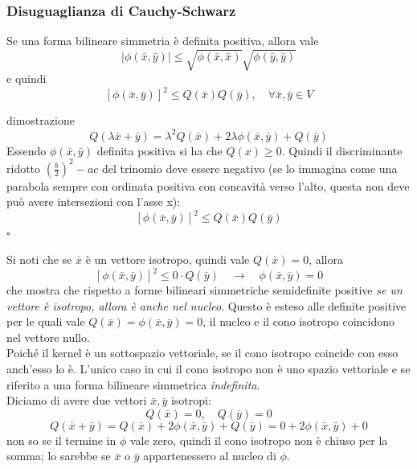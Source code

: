 \documentclass[x11names]{article}
\newcommand*{\QEDB}{\null\nobreak\hfill\ensuremath{\square}}%
\begin{document}
\begin{center}
	\colorbox{myred}{\begin{minipage}{5.75in}
			\begin{redes}{}
				\subsubsection{Disuguaglianza di Cauchy-Schwarz}
				Se una forma bilineare simmetria è definita positiva, allora vale
				\[
				| \phi(\bar{x},\bar{y}) | \leq \sqrt{\phi(\bar{x},\bar{x})} \sqrt{\phi(\bar{y},\bar{y})}
				\] 
				e quindi
				\[
				\left[\phi(\bar{x},\bar{y})\right]^2\leq Q(\bar{x})Q(\bar{y}), \quad \forall \bar{x},\bar{y} \in V
				\]
			\end{redes}
	\end{minipage}}        
\end{center}
\begin{es}{dimostrazione}
	\[
	Q(\lambda \bar{x}+\bar{y}) = \lambda^2Q(\bar{x}) + 2\lambda\phi(\bar{x},\bar{y}) + Q(\bar{y})
	\]
	Essendo $\phi(\bar{x},\bar{y})$ definita positiva si ha che $Q(x) \geq 0$. Quindi il discriminante ridotto $\left(\frac{b}{2}\right)^2 -ac$ del trinomio deve essere negativo (se lo immagina come una parabola sempre con ordinata positiva con concavità verso l'alto, questa non deve può avere intersezioni con l'asse x):
	\[
	\left[\phi(\bar{x},\bar{y})\right]^2\leq Q(\bar{x})Q(\bar{y})
	\] \QEDB
\end{es}
Si noti che se $\bar{x}$ è un vettore isotropo, quindi vale $Q(\bar{x}) = 0$, allora
\[
\left[\phi(\bar{x},\bar{y})\right]^2\leq 0\cdot Q(\bar{y}) \quad \to \quad \phi(\bar{x},\bar{y}) = 0
\]
che mostra che rispetto a forme bilineari simmetriche semidefinite positive \textit{se un vettore è isotropo, allora è anche nel nucleo}. Questo è esteso alle definite positive per le quali vale $Q(\bar{x}) = \phi(\bar{x},\bar{y}) = 0$, il nucleo e il cono isotropo coincidono nel vettore nullo. \\

\noindent
Poiché il kernel è un sottospazio vettoriale, se il cono isotropo coincide con esso anch'esso lo è. L'unico caso in cui il cono isotropo non è uno spazio vettoriale e se riferito a una forma bilineare simmetrica \textit{indefinita}.\\

\noindent
Diciamo di avere due vettori $\bar{x},\bar{y}$ isotropi:
\[
Q(\bar{x}) = 0, \quad Q(\bar{y}) = 0
\]
\[
Q(\bar{x} + \bar{y}) = Q(\bar{x}) + 2 \phi(\bar{x},\bar{y}) + Q(\bar{y}) = 0 + 2 \phi(\bar{x},\bar{y}) + 0
\]
non so se il termine in $\phi$ vale zero, quindi il cono isotropo non è chiuso per la somma; lo sarebbe se $\bar{x}$ o $\bar{y}$ appartenessero al nucleo di $\phi$.
\end{document}
